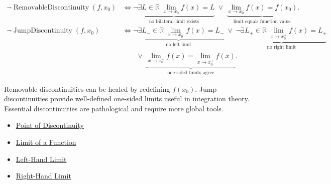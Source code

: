 \begin{remark*}
\[
\begin{aligned}
\neg \operatorname{RemovableDiscontinuity}(f,x_0) &\Longleftrightarrow
\underbrace{\neg \exists L \in \mathbb{R}\; \lim_{x \to x_0} f(x) = L}_{\text{no bilateral limit exists}}
\;\lor\;
\underbrace{\lim_{x \to x_0} f(x) = f(x_0)}_{\text{limit equals function value}}.\\
\neg \operatorname{JumpDiscontinuity}(f,x_0) &\Longleftrightarrow
\underbrace{\neg \exists L_{-} \in \mathbb{R}\; \lim_{x \to x_0^-} f(x) = L_{-}}_{\text{no left limit}}
\;\lor\;
\underbrace{\neg \exists L_{+} \in \mathbb{R}\; \lim_{x \to x_0^+} f(x) = L_{+}}_{\text{no right limit}}\\
&\qquad\lor\;
\underbrace{\lim_{x \to x_0^-} f(x) = \lim_{x \to x_0^+} f(x)}_{\text{one-sided limits agree}}.
\end{aligned}
\]
\end{remark*}

\begin{remark*}[Interpretation]
Removable discontinuities can be healed by redefining $f(x_0)$. Jump discontinuities provide well-defined one-sided limits useful in integration theory. Essential discontinuities are pathological and require more global tools.
\end{remark*}

\begin{dependencies}
\begin{itemize}
  \item \hyperref[def:point-of-discontinuity]{Point of Discontinuity}
  \item \hyperref[def:limit-function]{Limit of a Function}
  \item \hyperref[def:left-hand-limit]{Left-Hand Limit}
  \item \hyperref[def:right-hand-limit]{Right-Hand Limit}
\end{itemize}
\end{dependencies}
